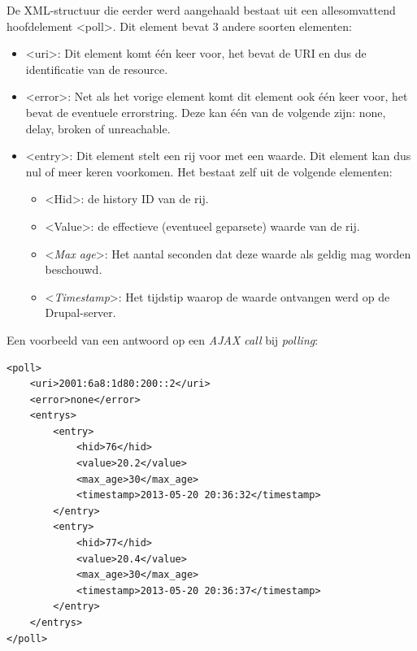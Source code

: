 De XML-structuur die eerder werd aangehaald bestaat uit een allesomvattend hoofdelement \textless poll\textgreater. Dit element bevat 3 andere soorten elementen:
\begin{itemize}
\item \textless uri\textgreater: Dit element komt \'{e}\'{e}n keer voor, het bevat de URI en dus de identificatie van de resource.
\item \textless error\textgreater: Net als het vorige element komt dit element ook \'{e}\'{e}n keer voor, het bevat de eventuele errorstring. Deze kan \'{e}\'{e}n van de volgende zijn: none, delay, broken of unreachable.
\item \textless entry\textgreater: Dit element stelt een rij voor met een waarde. Dit element kan dus nul of meer keren voorkomen. Het bestaat zelf uit de volgende elementen:
\begin{itemize}
\item \textless Hid\textgreater: de history ID van de rij.
\item \textless Value\textgreater: de effectieve (eventueel geparsete) waarde van de rij.
\item \textless \textit{Max age}\textgreater: Het aantal seconden dat deze waarde als geldig mag worden beschouwd.
\item \textless \textit{Timestamp}\textgreater: Het tijdstip waarop de waarde ontvangen werd op de Drupal-server.
\end{itemize}
\end{itemize}

Een voorbeeld van een antwoord op een \textit{AJAX call} bij \textit{polling}:

\lstset{language=XML}

\begin{lstlisting}[label=xmlPolling,caption=Voorbeeld antwoord op \textit{AJAX call} bij polling]
<poll>
	<uri>2001:6a8:1d80:200::2</uri>
	<error>none</error>
	<entrys>
		<entry>
			<hid>76</hid>
			<value>20.2</value>
			<max_age>30</max_age>
			<timestamp>2013-05-20 20:36:32</timestamp>
		</entry>
		<entry>
			<hid>77</hid>
			<value>20.4</value>
			<max_age>30</max_age>
			<timestamp>2013-05-20 20:36:37</timestamp>
		</entry>
	</entrys>
</poll>
\end{lstlisting}

